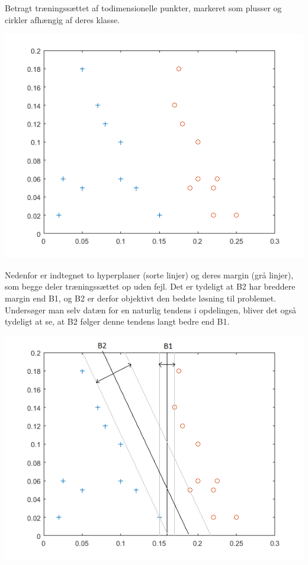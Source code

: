 \documentclass{article}
\begin{document}
Betragt træningssættet af todimensionelle punkter, markeret som plusser og cirkler afhængig af deres klasse.

\begin{center}
	\includegraphics{maximal_margin_hyperplane_1}
\end{center}

Nedenfor er indtegnet to hyperplaner (sorte linjer) og deres margin (grå linjer), som begge deler træningssættet op uden fejl. Det er tydeligt at B2 har breddere margin end B1, og B2 er derfor objektivt den bedste løsning til problemet. Undersøger man selv datæn for en naturlig tendens i opdelingen, bliver det også tydeligt at se, at B2 følger denne tendens langt bedre end B1.

\begin{center}
	\includegraphics{maximal_margin_hyperplane_2}
\end{center}
\end{document}
